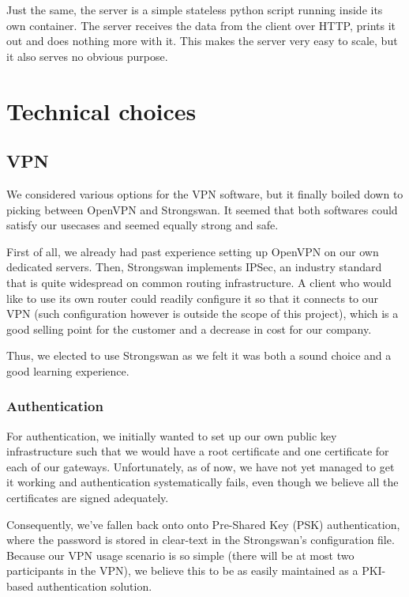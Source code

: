 \documentclass[paper=a4, fontsize=11pt]{scrartcl}
\begin{document}
Just the same, the server is a simple stateless python script running inside its
own container.
The server receives the data from the client over HTTP, prints it out and does
nothing more with it.
This makes the server very easy to scale, but it also serves no obvious
purpose.

\section{Technical choices}

\subsection{VPN}

We considered various options for the VPN software, but it finally boiled down
to picking between OpenVPN and Strongswan.
It seemed that both softwares could satisfy our usecases and seemed equally
strong and safe.

First of all, we already had past experience setting up OpenVPN on our own
dedicated servers.
Then, Strongswan implements IPSec, an industry standard that is quite widespread
on common routing infrastructure.
A client who would like to use its own router could readily configure
it so that it connects to our VPN (such configuration however is outside the
scope of this project), which is a good selling point for the customer and a
decrease in cost for our company.

Thus, we elected to use Strongswan as we felt it was both a sound choice and a
good learning experience.

\subsubsection{Authentication}

For authentication, we initially wanted to set up our own public key
infrastructure such that we would have a root certificate and one certificate
for each of our gateways.
Unfortunately, as of now, we have not yet managed to get it working and
authentication systematically fails, even though we believe all the certificates
are signed adequately.

Consequently, we've fallen back onto onto Pre-Shared Key (PSK) authentication,
where the password is stored in clear-text in the Strongswan's configuration
file.
Because our VPN usage scenario is so simple (there will be at most two
participants in the VPN), we believe this to be as easily maintained as a
PKI-based authentication solution.\\
\end{document}
